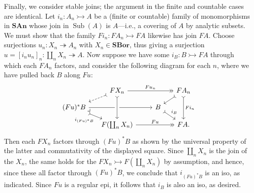 \documentclass[11pt]{amsart}
\newcommand\pb[1][rd]{\ar[#1, phantom, "\lrcorner", pos=0]}
\newcommand\SAn{\mathbf{SAn}}
\newcommand\SBor{\mathbf{SBor}}
\newcommand\Sub{\operatorname{Sub}}
\newcommand\too{\twoheadrightarrow}
\newcommand\tto{\rightarrowtail}
\theoremstyle{definition}
\theoremstyle{remark}
\theoremstyle{plain}
\begin{document}
Finally, we consider stable joins; the argument in the finite and countable cases are identical.
Let \( i_n \colon A_n \tto A \) be a (finite or countable) family of monomorphisms in \( \SAn \) whose join in \( \Sub(A) \) is \( A \)---i.e., a covering of \( A \) by analytic subsets.
We must show that the family \( F i_n \colon F A_n \tto F A \) likewise has join \( F A \).
Choose surjections \( u_n \colon X_n \too A_n \) with \( X_n \in \SBor \), thus giving a surjection \( u = [i_n u_n]_n \colon \coprod_n X_n \too A \).
Now suppose we have some \( i_B \colon B \tto F A \) through which each \( F A_n \) factors, and consider the following diagram for each \( n \), where we have pulled back \( B \) along \( F u \):
\[
  \begin{tikzcd}
    &[-10pt] F X_n \ar[rr, "F u_n", ->>] \ar[ld, dashed, >->] &&[-10pt] F A_n \ar[dd, >->, "F i_n"] \ar[ld, >->] \\[-10pt]
    (F u)^* B \ar[rr] \ar[rd, >->, "i_{(F u)^* B}"'] \pb[rrrd] && B \ar[rd, >->, "i_B"] \\[-10pt]
    & F(\coprod_n X_n) \ar[from=uu, crossing over, >->] \ar[rr, "F u", ->>] & {} & FA.
  \end{tikzcd}
\]
Then each \( F X_n \) factors through \( (F u)^* B \) as shown by the universal property of the latter and commutativity of the displayed square.
Since \( \coprod_n X_n \) is the join of the \( X_n \), the same holds for the \( F X_n \tto F(\coprod_n X_n) \) by assumption, and hence, since these all factor through \( (F u)^* B \), we conclude that \( i_{(F u)^* B} \) is an iso, as indicated.
Since \( F u \) is a regular epi, it follows that \( i_B \) is also an iso, as desired.

\printbibliography
\end{document}
